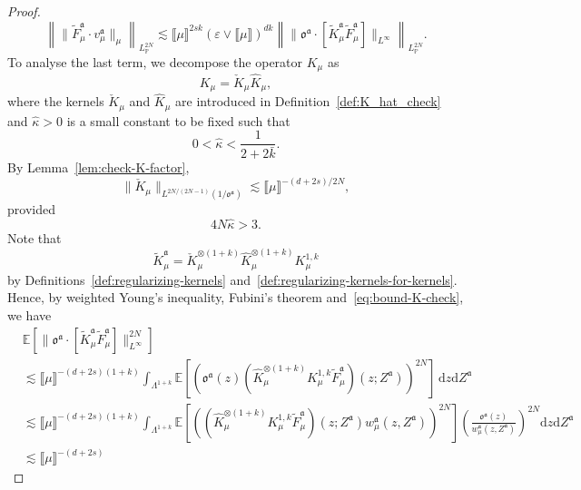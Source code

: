 \documentclass{article}
\numberwithin{equation}{section}
\newcommand{\mathd}{\mathrm{d}}
\theoremstyle{plain}
\theoremstyle{definition}
\begin{document}
\begin{proof}
\begin{equation}
    \left\| \| \tilde{F}^{\mathfrak{a}}_{ \mu} \cdot v^{\mathfrak{a}}_{\mu}
    \|_{\mu}  \right\|_{L^{2 N}_{\mathbb{P}}} \lesssim \llbracket
    \mu \rrbracket^{2 s k}  (\varepsilon \vee \llbracket \mu \rrbracket)^{d
    k}  \left\| \| \mathfrak{o}^{\mathfrak{a}} \cdot
    [\tilde{K}^{\mathfrak{a}}_{\mu} \tilde{F}_{\mu}^{\mathfrak{a}}]
    \|_{L^{\infty}}  \right\|_{L^{2 N}_{\mathbb{P}}} . \label{eq:nuF-F}
  \end{equation}
  To analyse the last term, we decompose the operator $K_{\mu}$ as
  \[ K_{\mu} = \check{K}_{\mu}  \hat{K}_{\mu}, \]
  where the kernels $\check K_\mu$ and $\hat K_\mu$ are introduced in Definition~\ref{def:K_hat_check} and $\hat{\kappa} > 0$ is a small constant to be fixed such that
  \[
  0<\hat\kappa<\frac1{2+2\bar k}.
  \]
  By
  Lemma~\ref{lem:check-K-factor},
  \begin{equation}
    \| \check{K}_{\mu} \|_{L^{2 N / (2 N - 1)} (1
    /\mathfrak{o}^{\mathfrak{a}}) } \lesssim \llbracket \mu \rrbracket^{- (d
    + 2 s) / 2 N}, \label{eq:bound-K-check}
  \end{equation}
  provided \[4 N \hat{\kappa} > 3.\]
  Note that
  \[ \tilde{K}^{\mathfrak{a}}_{\mu} = \check{K}^{\otimes (1 +
     k)}_{\mu} \hat{K}^{\otimes (1 + k)}_{\mu} K_{\mu}^{1, k} \]
  by Definitions~\ref{def:regularizing-kernels}
  and~\ref{def:regularizing-kernels-for-kernels}. Hence, by weighted Young's
  inequality, Fubini's theorem and~\eqref{eq:bound-K-check}, we have
  \[ \begin{aligned}
       &\mathbb{E} [\| \mathfrak{o}^{\mathfrak{a}} \cdot
       [\tilde{K}^{\mathfrak{a}}_{\mu} \tilde{F}_{\mu}^{\mathfrak{a}}]
       \|_{L^{\infty}}^{2 N}]\\[3pt]
        &\lesssim \llbracket \mu \rrbracket^{- (d + 2 s) (1 + k)}
       \int_{\Lambda^{1 + k}} \mathbb{E} [(\mathfrak{o}^{\mathfrak{a}} (z) 
       (\hat{K}^{\otimes (1 + k)}_{\mu} K_{\mu}^{1, k}
       \tilde{F}_{\mu}^{\mathfrak{a}}) (z ; Z^{\mathfrak{a}}))^{2 N}]\,\mathd z
       \mathd Z^{\mathfrak{a}}\\[3pt]
       &\lesssim \llbracket \mu \rrbracket^{- (d + 2 s) (1 + k)}
       \int_{\Lambda^{1 + k}} \mathbb{E} [((\hat{K}^{\otimes (1 + k)}_{\mu}
       K_{\mu}^{1, k} \tilde{F}_{\mu}^{\mathfrak{a}}) (z ; Z^{\mathfrak{a}})
       w^{\mathfrak{a}}_{\mu} (z, Z^{\mathfrak{a}}))^{2 N}]{\left(
       \frac{\mathfrak{o}^{\mathfrak{a}} (z)}{w^{\mathfrak{a}}_{\mu} (z,
       Z^{\mathfrak{a}})} \right) }^{2 N} \mathd z \mathd Z^{\mathfrak{a}}\\[3pt]
       &\lesssim \llbracket \mu \rrbracket^{- (d + 2 s)
}
\end{aligned}\]
\end{proof}
\end{document}
